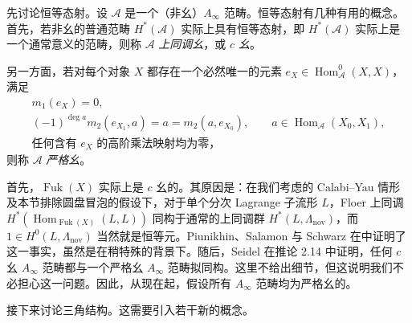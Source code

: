 \begin{definition*}
先讨论恒等态射。设 $\mathcal A$ 是一个（非幺）$A_\infty$ 范畴。恒等态射有几种有用的概念。首先，若非幺的普通范畴 $H^*(\mathcal A)$ 实际上具有恒等态射，即 $H^*(\mathcal A)$ 实际上是一个通常意义的范畴，则称 $\mathcal A$ \emph{上同调幺}，或 \emph{$c$ 幺}。

另一方面，若对每个对象 $X$ 都存在一个必然唯一的元素 $e_X\in\operatorname{Hom}_{\mathcal A}^0(X,X)$，满足
\[
\begin{gathered}
m_1(e_X)=0,\\
(-1)^{\deg a}m_2(e_{X_1},a)=a=m_2(a,e_{X_0}),
\qquad a\in\operatorname{Hom}_{\mathcal A}(X_0,X_1),\\
\text{任何含有 }e_X\text{ 的高阶乘法映射均为零，}
\end{gathered}
\]
则称 $\mathcal A$ \emph{严格幺}。
\end{definition*}

首先，$\operatorname{Fuk}(X)$ 实际上是 $c$ 幺的。其原因是：在我们考虑的 Calabi--Yau 情形及本节排除圆盘冒泡的假设下，对于单个分次 Lagrange 子流形 $L$，Floer 上同调 $H^*(\operatorname{Hom}_{\operatorname{Fuk}(X)}(L,L))$ 同构于通常的上同调群 $H^*(L,\Lambda_{\mathrm{nov}})$，而 $1\in H^0(L,\Lambda_{\mathrm{nov}})$ 当然就是恒等元。Piunikhin、Salamon 与 Schwarz 在中证明了这一事实，虽然是在稍特殊的背景下。随后，Seidel 在推论 2.14 中证明，任何 $c$ 幺 $A_\infty$ 范畴都与一个严格幺 $A_\infty$ 范畴拟同构。这里不给出细节，但这说明我们不必担心这一问题。因此，从现在起，假设所有 $A_\infty$ 范畴均为严格幺的。

接下来讨论三角结构。这需要引入若干新的概念。

